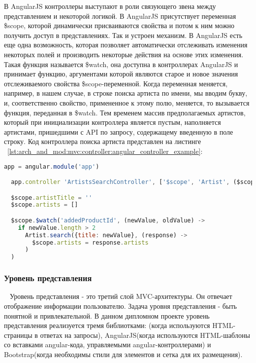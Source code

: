 В AngularJS контроллеры выступают в роли связующего звена между представлением и некоторой логикой. В AngularJS присутствует переменная \$scope, которой динамически присваиваются свойства и потом к ним можно получить доступ в представлениях. Так и устроен механизм. В AngularJS есть еще одна возможность, которая позволяет автоматически отслеживать изменения некоторых полей и производить некоторые действия на основе этих изменения. Такая функция называется \$watch, она доступна в контроллерах AngularJS и принимает функцию, аргументами которой являются старое и новое значения отслеживаемого свойства \$scope-переменной. Когда переменная меняется, например, в нашем случае, в строке поиска артиста по имени, мы вводим букву, и, соответственно свойство, примененное к этому полю, меняется, то вызывается функция, переданная в \$watch. Тем временем массив предполагаемых артистов, который при инициализации контроллера является пустым, наполняется артистами, пришедшими с API по запросу, содержащему введенную в поле строку. Код контроллера поиска артиста представлен на листинге ~\ref{lst:arch_and_mod:mvc:controller:angular_controller_example}:

\begin{lstlisting}[language=JavaScript,caption={Пример получения артистов по определенным параметрам}, label=lst:arch_and_mod:mvc:controller:angular_controller_example]
  app = angular.module('app')

  app.controller 'ArtistsSearchController', ['$scope', 'Artist', ($scope, Artist) ->

  $scope.artistTitle = ''
  $scope.artists = []

  $scope.$watch('addedProductId', (newValue, oldValue) ->
    if newValue.length > 2
      Artist.search({title: newValue}, (response) ->
        $scope.artists = response.artists
      )
  )
\end{lstlisting}

\subsubsection{Уровень представления}
\label{sub:arch_and_mod:mvc:view}
~\newline
\indent Уровень представления - это третий слой MVC-архитектуры. Он отвечает отображение информации пользователю. Задача уровня представления - быть понятной и привлекательной. В данном дипломном проекте уровень представления реализуется тремя библиотками: \ror{}(когда используются HTML-страницы в ответах на запросы), AngularJS(когда используются HTML-шаблоны со вставками angular-кода, управляемыми angular-контроллерами) и Bootstrap(когда необходимы стили для элементов и сетка для их размещения).

